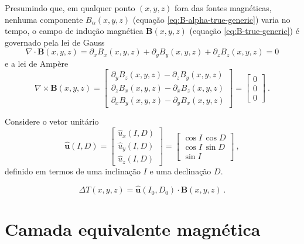 Presumindo que, em qualquer ponto $(x, y, z)$ fora das fontes magnéticas, nenhuma 
componente $B_{\alpha}(x, y, z)$ (equação \ref{eq:B-alpha-true-generic}) varia no tempo, 
o campo de indução magnética $\mathbf{B}(x, y, z)$ (equação \ref{eq:B-true-generic}) é governado
pela lei de Gauss
\begin{equation}
\nabla \cdot \mathbf{B}(x, y, z) = 
\partial_{x} B_{x}(x, y, z) + \partial_{y} B_{y}(x, y, z) + \partial_{z} B_{z}(x, y, z) = 
0
\label{eq:lei-Gauss}
\end{equation}
e a lei de Ampère
\begin{equation}
\nabla \times \mathbf{B}(x, y, z) = \begin{bmatrix}
\partial_{y} B_{z}(x, y, z) - \partial_{z} B_{y}(x, y, z) \\
\partial_{z} B_{x}(x, y, z) - \partial_{x} B_{z}(x, y, z) \\
\partial_{x} B_{y}(x, y, z) - \partial_{y} B_{x}(x, y, z) 
\end{bmatrix} = 
\begin{bmatrix}
0 \\
0 \\
0
\end{bmatrix} \: .
\label{eq:lei-Ampere}
\end{equation}



Considere o vetor unitário 
\begin{equation}
\hat{\mathbf{u}}(I, D) = 
\begin{bmatrix}
\hat{u}_{x}(I, D) \\
\hat{u}_{y}(I, D) \\
\hat{u}_{z}(I, D) 
\end{bmatrix} = 
\begin{bmatrix}
\cos I \, \cos D \\
\cos I \, \sin D \\
\sin I
\end{bmatrix} \: ,
\label{eq:u-hat}
\end{equation}
definido em termos de uma inclinação $I$ e uma declinação $D$.


\begin{equation}
\Delta T(x, y, z) = \hat{\mathbf{u}}(I_{0}, D_{0}) \cdot \mathbf{B}(x, y, z) \: .
\label{eq:Delta-T-true}
\end{equation}


\section{Camada equivalente magnética}
\label{sec:camada-equivalente}


